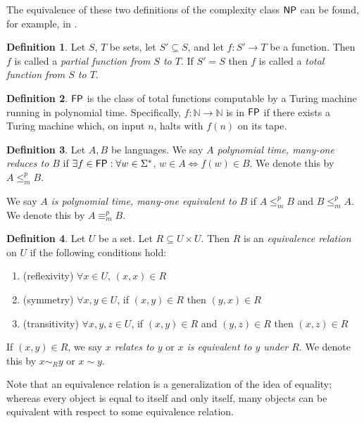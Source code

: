 \documentclass{article}
\theoremstyle{definition} \newtheorem{definition}[definition]{Definition}
\newcommand{\sigmastar}{\Sigma^{*}} %
\newcommand{\mor}{\leq^{p}_{m}} %
\newcommand{\moequiv}{\equiv^{p}_m} %
\newcommand{\defn}[1]{\emph{#1}} %
\begin{document}
The equivalence of these two definitions of the complexity class ${\mathsf{NP}}$ can be
found, for example, in \cite{sipser06}.

\begin{definition}
  Let $S$, $T$ be sets, let $S'\subseteq S$, and let $f:S'\to T$ be a
  function. Then $f$ is called a \defn{partial function from $S$ to $T$}. If
  $S'=S$ then $f$ is called a \defn{total function from $S$ to $T$}.
\end{definition}

\begin{definition}
  ${\mathsf{FP}}$ is the class of total functions computable by a Turing machine running
  in polynomial time. Specifically, $f\colon\mathbb{N}\to\mathbb{N}$ is in
  ${\mathsf{FP}}$ if there exists a Turing machine which, on input $n$, halts with $f(n)$
  on its tape.
\end{definition}

\begin{definition}
  Let $A,B$ be languages. We say \defn{$A$ polynomial time, many-one reduces to
    $B$} if $\exists f\in\FP:\forall w\in\sigmastar$, $w\in A\iff f(w)\in
    B$. We denote this by $A\mor B$.
  
  We say $A$ \defn{is polynomial time, many-one equivalent to} $B$ if $A\mor
  B$ and $B\mor A$. We denote this by $A\moequiv B$.
\end{definition}

\begin{definition}
  Let $U$ be a set. Let $R\subseteq U\times U$. Then $R$ is an
    \defn{equivalence relation} on $U$ if the following conditions hold:
    \renewcommand{\labelenumi}{\roman{enumi}.}
  \begin{enumerate}
  \item (reflexivity) $\forall x\in U$, $(x, x)\in R$
  \item (symmetry) $\forall x,y\in U$, if $(x,y)\in R$ then $(y,x)\in
    R$
  \item (transitivity) $\forall x,y,z\in U$, if $(x,y)\in R$ and $(y,z)\in R$
    then $(x,z)\in R$
  \end{enumerate}
  If $(x,y)\in R$, we say \defn{$x$ relates to $y$} or \defn{$x$ is equivalent
    to $y$ under $R$}. We denote this by $x\sim_R y$ or $x\sim y$.
\end{definition}

Note that an equivalence relation is a generalization of the idea of equality;
whereas every object is equal to itself and only itself, many objects can be
equivalent with respect to some equivalence relation.
\end{document}
